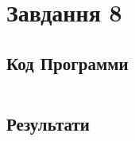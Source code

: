 \section{Завдання 8}
\label{sec:task8}

\subsection{Код Программи}
\label{subsec:task8_code}
\inputminted{python}{../src/task8.py}

\subsection{Результати}
\label{subsec:task8_results}
